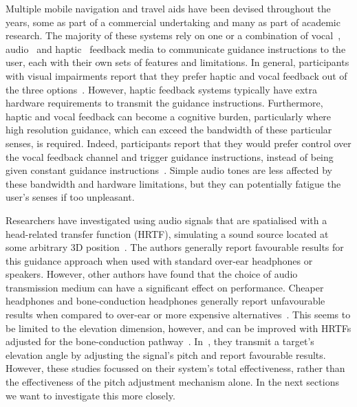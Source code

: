 \documentclass{llncs}
\begin{document}
Multiple mobile navigation and travel aids have been devised throughout the years, some as part of a commercial undertaking and many as part of academic research.
The majority of these systems rely on one or a combination of vocal~\cite{mocanu2016when,chessa2016integrated,kanwal2015navigation}, audio~\cite{schwarze2015intuitive,rodriguez2012obstacle,katz2010navig} and haptic~\cite{rivera-rubio2015assistive,lee2015rgb,xiao2015assistive} feedback media to communicate guidance instructions to the user, each with their own sets of features and limitations.
In general, participants with visual impairments report that they prefer haptic and vocal feedback out of the three options~\cite{arditi2013user}.
However, haptic feedback systems typically have extra hardware requirements to transmit the guidance instructions.
Furthermore, haptic and vocal feedback can become a cognitive burden, particularly where high resolution guidance, which can exceed the bandwidth of these particular senses, is required.
Indeed, participants report that they would prefer control over the vocal feedback channel and trigger guidance instructions, instead of being given constant guidance instructions~\cite{arditi2013user}.
Simple audio tones are less affected by these bandwidth and hardware limitations, but they can potentially fatigue the user's senses if too unpleasant.

Researchers have investigated using audio signals that are spatialised with a head-related transfer function (HRTF), simulating a sound source located at some arbitrary 3D position~\cite{geronazzo2016interactive,wilson2007swan,katz2010navig,blum2013spatialized}.
The authors generally report favourable results for this guidance approach when used with standard over-ear headphones or speakers. 
However, other authors have found that the choice of audio transmission medium can have a significant effect on performance.
Cheaper headphones and bone-conduction headphones generally report unfavourable results when compared to over-ear or more expensive alternatives~\cite{schonstein2008comparison,macdonald2006spatial,stanley2006lateralization}. 
This seems to be limited to the elevation dimension, however, and can be improved with HRTFs adjusted for the bone-conduction pathway~\cite{stanley2006lateralization}.
In~\cite{durette2008visuo}, they transmit a target's elevation angle by adjusting the signal's pitch and report favourable results. 
However, these studies focussed on their system's total effectiveness, rather than the effectiveness of the pitch adjustment mechanism alone. In the next sections we want to investigate this more closely. 
\end{document}
